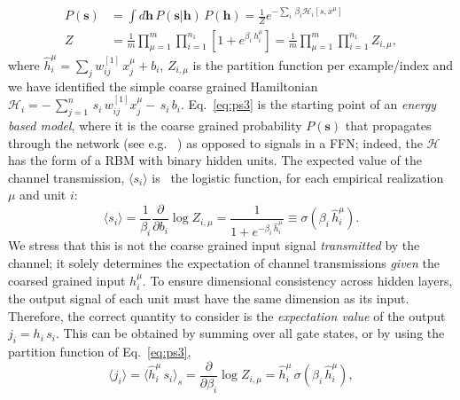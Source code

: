 \documentclass{article}
\begin{document}
%
\begin{align} \label{eq:ps3}
P(\mathbf{s}) &= \int d \mathbf{h} \, P(\mathbf{s} | \mathbf{h}) \, P(\mathbf{h}) =  \frac{1}{Z} e^{-\sum_i \, \beta_i \mathscr{H}_i[s, x^{\mu}]}   \\ \nonumber
Z &= \frac{1}{m} \prod_{\mu=1}^m \prod_{i=1}^{n_1} \left[1+ e^{\beta_i \, h^{\mu}_i} \right] =\frac{1}{m} \prod_{\mu=1}^m \prod_{i=1}^{n_1} Z_{i, \mu},
\end{align}
%
where $\hat{h}^{\mu}_i = \sum_{j} w^{[1]}_{ij} \, x^{\mu}_j + b_i $,   $Z_{i, \mu}$ is the partition function per example/index and we have identified the simple coarse grained Hamiltonian $\mathscr{H}_i = -  \, \sum_{j=1}^n \, s_i \, w^{[1]}_{ij} x^{\mu}_j -  \, s_i \, b_i$.
%
%
Eq.~\eqref{eq:ps3} is the starting point of an {\it energy based model}, where it is the coarse grained probability $P(\mathbf{s})$ that propagates through the network (see e.g.~\cite{connie} ) as opposed to signals in a FFN; indeed, the $\mathscr{H}$ has the form of a RBM with binary hidden units. The expected value of the channel transmission, $\langle s_i \rangle$ is~\cite{hertz} the logistic function, for each empirical realization $\mu$ and unit $i$:
%
\begin{equation} \label{eq:ps4}
\langle s_i \rangle = \frac{1}{\beta_i} \frac{\partial}{\partial b_i} \log Z_{i, \mu} =  \frac{1}{1+ e^{-\beta_i \, \hat{h}^{\mu}_i}} \equiv   \sigma(\beta_i \, \hat{h}^{\mu}_i).
\end{equation}
%
We stress that this is not the coarse grained input signal {\it transmitted} by the channel; it solely determines the expectation of channel transmissions {\it given} the coarsed grained input $h_i^{\mu}$. To ensure dimensional consistency across hidden layers, the output signal of each unit must have the same dimension as its input. Therefore, the correct quantity to consider is the {\it expectation value} of the output $j_i = h_i \, s_i $.  This can be  obtained by summing over all gate states, or by using the partition function of Eq.~\eqref{eq:ps3},
%
\begin{equation} \label{eq:ps5}
\langle j_i \rangle = \langle \hat{h}_i^{\mu} \, s_i \rangle_s = \frac{\partial}{\partial \beta_i} \log{Z_{i,\mu}} = \hat{h}^{\mu}_i \, \sigma(\beta_i \, \hat{h}^{\mu}_i),
\end{equation}
\end{document}

